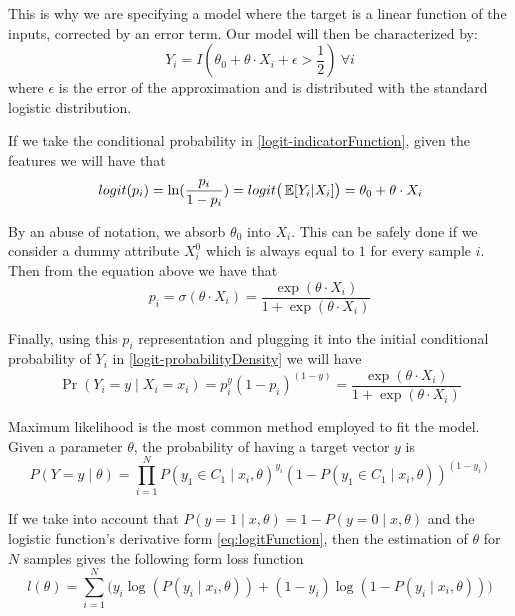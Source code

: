 This is why we are specifying a model where the target is a linear function of the inputs, corrected by an error term. Our model will then be characterized by:
\begin{equation}\label{logit-indicatorFunction}
Y_i = I(\theta_0 + \theta \cdot X_i + \epsilon > \frac{1}{2}) \ \forall i
\end{equation}
where $\epsilon$ is the error of the approximation and is distributed with the standard logistic distribution. %

If we take the conditional probability in \cref{logit-indicatorFunction}, given the features we will have that
\begin{equation}
logit(p_i)= \ln(\frac{p_i}{1-p_i}) = logit\big( \operatorname{\mathbb{E}}[Y_i| X_i] \big) = \theta_0 + \theta \cdot X_i
\end{equation}

By an abuse of notation, we absorb $\theta_0$ into $X_i$. This can be safely done if we consider a dummy attribute $X_i^0$ which is always equal to $1$ for every sample $i$. Then from the equation above we have that
\begin{equation}
p_i = \sigma(\theta \cdot X_i) = \frac{\exp(\theta \cdot X_i) }{1 + \exp(\theta \cdot X_i)}
\end{equation}

Finally, using this $p_i$ representation and plugging it into the initial conditional probability of $Y_i$ in \cref{logit-probabilityDensity} we will have
\begin{equation}
 \Pr(Y_i=y \mid X_i = x_i) = p_i^{y} {(1-p_i)}^{(1-y)} = \frac{\exp(\theta \cdot X_i) }{1 + \exp(\theta \cdot X_i)}
 \end{equation}


Maximum likelihood is the most common method employed to fit the model. %
Given a parameter $\theta$, the probability of having a target vector $y$ is
\begin{equation}
P(Y =y \mid \theta ) = \prod_{i=1}^N {P(y_1 \in C_1 \mid x_i, \theta)}^{y_i} {(1 - P(y_1 \in C_1 \mid x_i, \theta) )}^{(1-y_i)}
\end{equation}

If we take into account that $P(y=1 \mid x,\theta) = 1 - P(y=0 \mid x,\theta)$ and the logistic function's derivative form \cref{eq:logitFunction}, then the estimation of $\theta$ for $N$ samples gives the following form
loss function
\begin{equation}\label{eq:logLossFunction}
l(\theta) = \sum_{i=1}^N \big(y_i \log(P(y_i \mid x_i,\theta)) + (1-y_i)\log(1 - P(y_i \mid x_i,\theta) ) \big)
\end{equation}

